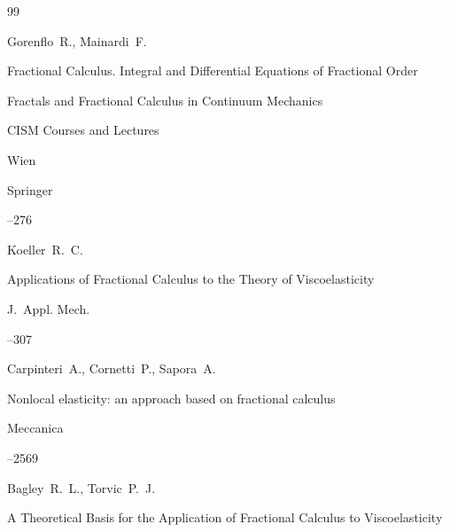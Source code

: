 \begin{thebibliography}{99}

\by Gorenflo~R., Mainardi~F.

\paper Fractional Calculus. Integral and Differential Equations of Fractional Order

\inbook Fractals and Fractional Calculus in Continuum Mechanics

\serial  CISM Courses and Lectures


\publaddr Wien

\publ  Springer


--276








\by Koeller~R.~C.

\paper Applications of Fractional Calculus to the Theory of Viscoelasticity

\jour J.~Appl. Mech. 




--307







\by Carpinteri~A., Cornetti~P., Sapora~A.

\paper Nonlocal elasticity: an approach based on fractional calculus

\jour Meccanica




--2569







\by Bagley~R.~L., Torvic~P.~J.

\paper  A Theoretical Basis for the Application of Fractional Calculus to Viscoelasticity 


\end{thebibliography}
